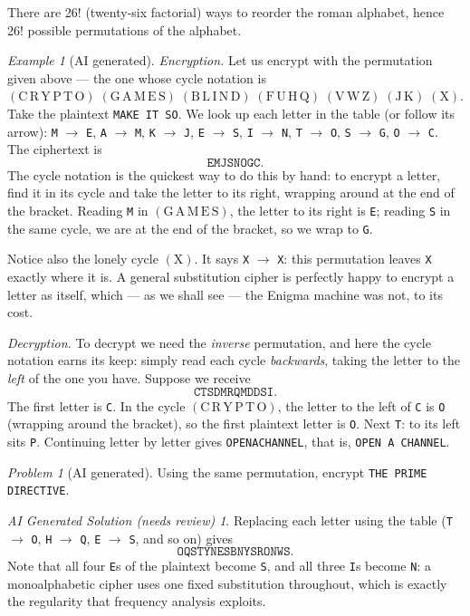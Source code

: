 \documentclass{article}
\theoremstyle{plain}
\theoremstyle{definition}
\theoremstyle{remark}
\newtheorem{example}[theorem]{Example}
\newtheorem{problem}[theorem]{Problem}
\newtheorem*{aisolution}{AI Generated Solution (needs review)}
\numberwithin{theorem}{section}
\begin{document}
There are 26! (twenty-six factorial) ways to reorder the roman alphabet, hence 26! possible permutations of the alphabet.

\begin{example}[AI generated]
\emph{Encryption.}  Let us encrypt with the permutation given above --- the one whose cycle notation is $(\mathrm{C\,R\,Y\,P\,T\,O})\;(\mathrm{G\,A\,M\,E\,S})\;(\mathrm{B\,L\,I\,N\,D})\;(\mathrm{F\,U\,H\,Q})\;(\mathrm{V\,W\,Z})\;(\mathrm{J\,K})\;(\mathrm{X})$.  Take the plaintext \texttt{MAKE IT SO}.  We look up each letter in the table (or follow its arrow):  \texttt{M} $\to$ \texttt{E}, \texttt{A} $\to$ \texttt{M}, \texttt{K} $\to$ \texttt{J}, \texttt{E} $\to$ \texttt{S}, \texttt{I} $\to$ \texttt{N}, \texttt{T} $\to$ \texttt{O}, \texttt{S} $\to$ \texttt{G}, \texttt{O} $\to$ \texttt{C}.  The ciphertext is
\[
	\texttt{EMJSNOGC}.
\]
The cycle notation is the quickest way to do this by hand:  to encrypt a letter, find it in its cycle and take the letter to its right, wrapping around at the end of the bracket.  Reading \texttt{M} in $(\mathrm{G\,A\,M\,E\,S})$, the letter to its right is \texttt{E}; reading \texttt{S} in the same cycle, we are at the end of the bracket, so we wrap to \texttt{G}.

Notice also the lonely cycle $(\mathrm{X})$.  It says \texttt{X} $\to$ \texttt{X}:  this permutation leaves \texttt{X} exactly where it is.  A general substitution cipher is perfectly happy to encrypt a letter as itself, which --- as we shall see --- the Enigma machine was not, to its cost.

\emph{Decryption.}  To decrypt we need the \emph{inverse} permutation, and here the cycle notation earns its keep:  simply read each cycle \emph{backwards}, taking the letter to the \emph{left} of the one you have.  Suppose we receive
\[
	\texttt{CTSDMRQMDDSI}.
\]
The first letter is \texttt{C}.  In the cycle $(\mathrm{C\,R\,Y\,P\,T\,O})$, the letter to the left of \texttt{C} is \texttt{O} (wrapping around the bracket), so the first plaintext letter is \texttt{O}.  Next \texttt{T}:  to its left sits \texttt{P}.  Continuing letter by letter gives \texttt{OPENACHANNEL}, that is, \texttt{OPEN A CHANNEL}.
\end{example}

\begin{problem}[AI generated]
Using the same permutation, encrypt \texttt{THE PRIME DIRECTIVE}.
\end{problem}
\begin{aisolution}
Replacing each letter using the table (\texttt{T} $\to$ \texttt{O}, \texttt{H} $\to$ \texttt{Q}, \texttt{E} $\to$ \texttt{S}, and so on) gives
\[
	\texttt{OQSTYNESBNYSRONWS}.
\]
Note that all four \texttt{E}s of the plaintext become \texttt{S}, and all three \texttt{I}s become \texttt{N}:  a monoalphabetic cipher uses one fixed substitution throughout, which is exactly the regularity that frequency analysis exploits.
\end{aisolution}
\end{document}
